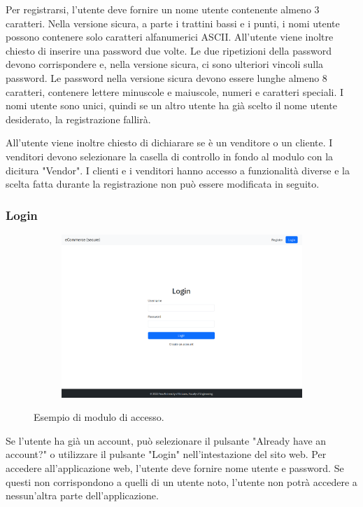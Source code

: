 \documentclass[conference,onecolumn,a4paper]{IEEEtran}
\begin{document}
{Per registrarsi, l'utente deve fornire un nome utente contenente almeno 3 caratteri. Nella versione sicura, a parte i trattini bassi e i punti, i nomi utente possono contenere solo caratteri alfanumerici ASCII. All'utente viene inoltre chiesto di inserire una password due volte. Le due ripetizioni della password devono corrispondere e, nella versione sicura, ci sono ulteriori vincoli sulla password. Le password nella versione sicura devono essere lunghe almeno 8 caratteri, contenere lettere minuscole e maiuscole, numeri e caratteri speciali. I nomi utente sono unici, quindi se un altro utente ha già scelto il nome utente desiderato, la registrazione fallirà.

All'utente viene inoltre chiesto di dichiarare se è un venditore o un cliente. I venditori devono selezionare la casella di controllo in fondo al modulo con la dicitura "Vendor". I clienti e i venditori hanno accesso a funzionalità diverse e la scelta fatta durante la registrazione non può essere modificata in seguito.

\subsubsection{Login}

\begin{figure}[H]
    \centering
    \begin{subfigure}[b]{0.4\linewidth}
        \includegraphics[width=\linewidth]{resources/login.png}
    \end{subfigure}
    \caption{Esempio di modulo di accesso.}
\end{figure}

Se l'utente ha già un account, può selezionare il pulsante "Already have an account?" o utilizzare il pulsante "Login" nell'intestazione del sito web. Per accedere all'applicazione web, l'utente deve fornire nome utente e password. Se questi non corrispondono a quelli di un utente noto, l'utente non potrà accedere a nessun'altra parte dell'applicazione.

}
\end{document}
